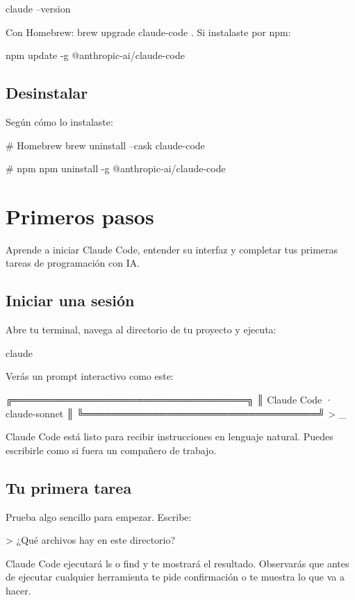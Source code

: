 \documentclass[11pt,a4paper]{book}
\begin{document}
\begin{codebox}
claude --version
\end{codebox}
Con Homebrew: brew upgrade claude-code . Si instalaste por npm:

\begin{codebox}
npm update -g @anthropic-ai/claude-code
\end{codebox}
\section{Desinstalar}
Según cómo lo instalaste:

\begin{codebox}
# Homebrew
brew uninstall --cask claude-code

# npm
npm uninstall -g @anthropic-ai/claude-code
\end{codebox}
\chapter{Primeros pasos}
Aprende a iniciar Claude Code, entender su interfaz y completar tus primeras tareas de programación con IA.

\section{Iniciar una sesión}
Abre tu terminal, navega al directorio de tu proyecto y ejecuta:

\begin{codebox}
claude
\end{codebox}
Verás un prompt interactivo como este:

\begin{codebox}
╔══════════════════════════════════╗
║  Claude Code  ·  claude-sonnet  ║
╚══════════════════════════════════╝
> _
\end{codebox}
Claude Code está listo para recibir instrucciones en lenguaje natural. Puedes escribirle como si fuera un compañero de trabajo.

\section{Tu primera tarea}
Prueba algo sencillo para empezar. Escribe:

\begin{codebox}
> ¿Qué archivos hay en este directorio?
\end{codebox}
Claude Code ejecutará ls o find y te mostrará el resultado. Observarás que antes de ejecutar cualquier herramienta te pide confirmación o te muestra lo que va a hacer.
\end{document}
